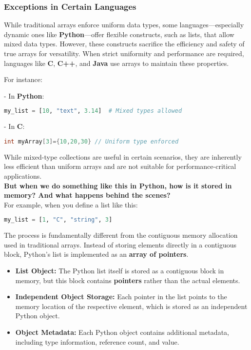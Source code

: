 \documentclass[12pt, oneside]{book}
\begin{document}
	\subsubsection{Exceptions in Certain Languages}
	
	While traditional arrays enforce uniform data types, some languages—especially dynamic ones like \textbf{Python}—offer flexible constructs, such as lists, that allow mixed data types. However, these constructs sacrifice the efficiency and safety of true arrays for versatility. When strict uniformity and performance are required, languages like \textbf{C}, \textbf{C++}, and \textbf{Java} use arrays to maintain these properties.
	
	For instance:
	
	- In \textbf{Python}:
	\begin{lstlisting}[language=Python]
		my_list = [10, "text", 3.14]  # Mixed types allowed
	\end{lstlisting}
	
	- In \textbf{C}:
	\begin{lstlisting}[language=C]
		int myArray[3]={10,20,30} // Uniform type enforced
	\end{lstlisting}
	
	While mixed-type collections are useful in certain scenarios, they are inherently less efficient than uniform arrays and are not suitable for performance-critical applications.\\
	\textbf{But when we do something like this in Python, how is it stored in memory? And what happens behind the scenes?}\\
	For example, when you define a list like this:  
	\begin{lstlisting}[language=Python]
		my_list = [1, "C", "string", 3]
	\end{lstlisting}
	The process is fundamentally different from the contiguous memory allocation used in traditional arrays. Instead of storing elements directly in a contiguous block, Python’s list is implemented as an \textbf{array of pointers}.
	\begin{itemize}
		\item \textbf{List Object:} The Python list itself is stored as a contiguous block in memory, but this block contains \textbf{pointers} rather than the actual elements.
		\item  \textbf{Independent Object Storage:} Each pointer in the list points to the memory location of the respective element, which is stored as an independent Python object.
		\item  \textbf{Object Metadata:} Each Python object contains additional metadata, including type information, reference count, and value.
	\end{itemize}
	
\end{document}
